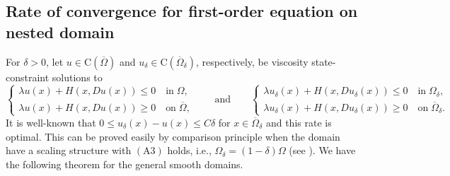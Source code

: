 \documentclass[11pt,reqno]{amsart}
\numberwithin{figure}{section}
\theoremstyle{plain}
\theoremstyle{remark}
\numberwithin{equation}{section}
\newcommand{\rmC}{\mathrm{C}}
\begin{document}
\subsection{Rate of convergence for first-order equation on nested domain}
For $\delta >0$, let $u\in \rmC(\overline{\Omega})$ and $u_\delta\in \rmC(\overline{\Omega}_\delta)$, respectively, be viscosity state-constraint solutions to 
\begin{equation*}
    \begin{cases}
    \lambda u(x)+H(x,Du(x)) \leq 0 \quad\text{in}\;\Omega,\\
    \lambda u(x)+H(x,Du(x)) \geq 0 \quad\text{on}\;\overline{\Omega},
    \end{cases}\qquad\text{and}\qquad 
    \begin{cases}
    \lambda u_\delta(x)+H(x,Du_\delta(x)) \leq 0 \quad\text{in}\;\Omega_\delta,\\
    \lambda u_\delta(x)+H(x,Du_\delta(x)) \geq 0 \quad\text{on}\;\overline{\Omega}_\delta.
    \end{cases}
\end{equation*} 
It is well-known that $0\leq u_\delta(x) - u(x) \leq C\delta$ for $x\in\overline{\Omega}_\delta$ and this rate is optimal. This can be proved easily by comparison principle when the domain have a scaling structure with $\mathrm{(A3)}$ holds, i.e., $\Omega_\delta = (1-\delta)\Omega$ (see \cite{kim_state-constraint_2020}). We have the following theorem for the general smooth domains.
\end{document}
